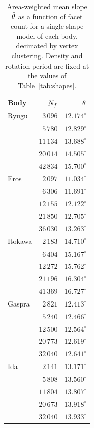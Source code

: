 \begin{table}[t]
\centering
\small
\caption{Area-weighted mean slope $\bar{\theta}$ as a function of facet count for
a single shape model of each body, decimated by vertex clustering. Density and
rotation period are fixed at the values of Table~\ref{tab:shapes}.}
\label{tab:slopeseries}
\begin{tabular}{lrr}
\toprule
Body & $N_{f}$ & $\bar{\theta}$ \\
\midrule
Ryugu   & $3\,096$  & $12.174^{\circ}$ \\
        & $5\,780$  & $12.829^{\circ}$ \\
        & $11\,134$ & $13.688^{\circ}$ \\
        & $20\,014$ & $14.505^{\circ}$ \\
        & $42\,834$ & $15.700^{\circ}$ \\
\midrule
Eros    & $2\,097$  & $11.034^{\circ}$ \\
        & $6\,306$  & $11.691^{\circ}$ \\
        & $12\,155$ & $12.122^{\circ}$ \\
        & $21\,850$ & $12.705^{\circ}$ \\
        & $36\,030$ & $13.263^{\circ}$ \\
\midrule
Itokawa & $2\,183$  & $14.710^{\circ}$ \\
        & $6\,404$  & $15.167^{\circ}$ \\
        & $12\,272$ & $15.762^{\circ}$ \\
        & $21\,196$ & $16.304^{\circ}$ \\
        & $41\,369$ & $16.727^{\circ}$ \\
\midrule
Gaspra  & $2\,821$  & $12.413^{\circ}$ \\
        & $5\,240$  & $12.466^{\circ}$ \\
        & $12\,500$ & $12.564^{\circ}$ \\
        & $20\,773$ & $12.619^{\circ}$ \\
        & $32\,040$ & $12.641^{\circ}$ \\
\midrule
Ida     & $2\,141$  & $13.171^{\circ}$ \\
        & $5\,808$  & $13.560^{\circ}$ \\
        & $11\,804$ & $13.807^{\circ}$ \\
        & $20\,673$ & $13.918^{\circ}$ \\
        & $32\,040$ & $13.933^{\circ}$ \\
\bottomrule
\end{tabular}
\end{table}

